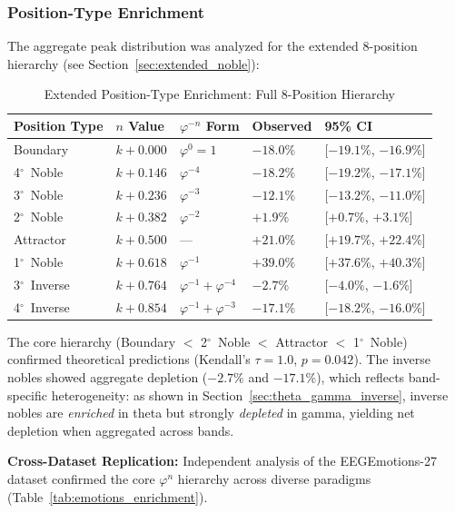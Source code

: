 \documentclass[11pt,a4paper]{article}
\newcommand{\degree}{$^\circ$}  %
\newcommand{\phisym}{\varphi}
\begin{document}
\subsubsection{Position-Type Enrichment}
The aggregate peak distribution was analyzed for the extended 8-position hierarchy (see Section~\ref{sec:extended_noble}):

\begin{table}[H]
\centering
\caption{Extended Position-Type Enrichment: Full 8-Position Hierarchy}
\label{tab:enrichment_results}
\begin{tabular}{@{}lllll@{}}
\toprule
Position Type & $n$ Value & $\phisym^{-n}$ Form & Observed & 95\% CI \\
\midrule
Boundary & $k + 0.000$ & $\phisym^0 = 1$ & $-18.0\%$ & [$-19.1\%$, $-16.9\%$] \\
4\degree\ Noble & $k + 0.146$ & $\phisym^{-4}$ & $-18.2\%$ & [$-19.2\%$, $-17.1\%$] \\
3\degree\ Noble & $k + 0.236$ & $\phisym^{-3}$ & $-12.1\%$ & [$-13.2\%$, $-11.0\%$] \\
2\degree\ Noble & $k + 0.382$ & $\phisym^{-2}$ & $+1.9\%$ & [$+0.7\%$, $+3.1\%$] \\
Attractor & $k + 0.500$ & --- & $+21.0\%$ & [$+19.7\%$, $+22.4\%$] \\
1\degree\ Noble & $k + 0.618$ & $\phisym^{-1}$ & $+39.0\%$ & [$+37.6\%$, $+40.3\%$] \\
3\degree\ Inverse & $k + 0.764$ & $\phisym^{-1} + \phisym^{-4}$ & $-2.7\%$ & [$-4.0\%$, $-1.6\%$] \\
4\degree\ Inverse & $k + 0.854$ & $\phisym^{-1} + \phisym^{-3}$ & $-17.1\%$ & [$-18.2\%$, $-16.0\%$] \\
\bottomrule
\end{tabular}
\end{table}

The core hierarchy (Boundary $<$ 2\degree\ Noble $<$ Attractor $<$ 1\degree\ Noble) confirmed theoretical predictions (Kendall's $\tau = 1.0$, $p = 0.042$). The inverse nobles showed aggregate depletion ($-2.7\%$ and $-17.1\%$), which reflects band-specific heterogeneity: as shown in Section~\ref{sec:theta_gamma_inverse}, inverse nobles are \textit{enriched} in theta but strongly \textit{depleted} in gamma, yielding net depletion when aggregated across bands.

\textbf{Cross-Dataset Replication:} Independent analysis of the EEGEmotions-27 dataset confirmed the core $\phisym^n$ hierarchy across diverse paradigms (Table~\ref{tab:emotions_enrichment}).
\end{document}
